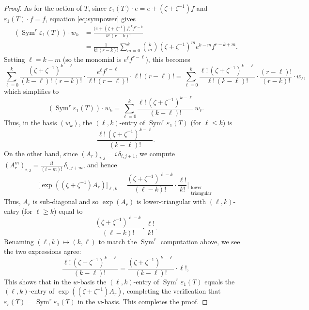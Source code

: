 \documentclass[11pt]{article}
\DeclareMathOperator{\Sym}{Sym}
\begin{document}
\begin{proof}
    As for the action of $ T $, since $\varepsilon_1(T)\cdot e = e + (\zeta+\zeta^{-1})f$ and $\varepsilon_1(T)\cdot f = f$, equation \eqref{eq:sympower} gives
    \begin{align*}
    \left(\Sym^r\varepsilon_1(T)\right)\cdot w_k
    &= \frac{\bigl(e+(\zeta+\zeta^{-1})f\bigr)^k f^{r-k}}{k!\,(r-k)!} \\
    &= \frac{1}{k!\,(r-k)!}\sum_{m=0}^{k}\binom{k}{m}(\zeta+\zeta^{-1})^m e^{k-m}f^{r-k+m}.
    \end{align*}
    Setting $\ell = k-m$ (so the monomial is $e^\ell f^{r-\ell}$), this becomes
    \[
    \sum_{\ell=0}^{k} \frac{(\zeta+\zeta^{-1})^{k-\ell}}{(k-\ell)!\,(r-k)!}\cdot \frac{e^\ell f^{r-\ell}}{\ell!\,(r-\ell)!}\cdot \ell!\,(r-\ell)!
    = \sum_{\ell=0}^{k} \frac{\ell!\,(\zeta+\zeta^{-1})^{k-\ell}}{\ell!\,(k-\ell)!} \cdot \frac{(r-\ell)!}{(r-k)!} \cdot w_\ell,
    \]
    which simplifies to
    \[
    \left(\Sym^r\varepsilon_1(T)\right)\cdot w_k = \sum_{\ell=0}^{k} \frac{\ell!\,(\zeta+\zeta^{-1})^{k-\ell}}{(k-\ell)!}\, w_\ell.
    \]
    Thus, in the basis $(w_k)$, the $(\ell,k)$-entry of $\Sym^r\varepsilon_1(T)$ (for $\ell \leq k$) is
    \[
    \frac{\ell!\,(\zeta+\zeta^{-1})^{k-\ell}}{(k-\ell)!}.
    \]
    On the other hand, since $(A_r)_{i,j}= i\,\delta_{i,j+1}$, we compute $(A_r^m)_{i,j} = \frac{i!}{(i-m)!}\,\delta_{i,j+m}$, and hence
    \[
    \bigl[\exp\!\left((\zeta+\zeta^{-1})A_r\right)\bigr]_{\ell,k} = \frac{(\zeta+\zeta^{-1})^{\ell-k}}{(\ell-k)!}\cdot\frac{\ell!}{k!}\Bigg|_{\substack{\text{lower}\\\text{triangular}}}
    \]
    Thus, $A_r$ is sub-diagonal and so $\exp(A_r)$ is lower-triangular with $(\ell,k)$-entry (for $\ell \geq k$) equal to
    \[
    \frac{(\zeta+\zeta^{-1})^{\ell-k}}{(\ell-k)!}\cdot\frac{\ell!}{k!}.
    \]
    Renaming $(\ell, k) \mapsto (k, \ell)$ to match the $\Sym^r$ computation above, we see the two expressions agree:
    \[
    \frac{\ell!\,(\zeta+\zeta^{-1})^{k-\ell}}{(k-\ell)!\,} = \frac{(\zeta+\zeta^{-1})^{k-\ell}}{(k-\ell)!}\cdot \ell!,
    \]
    This shows that in the $w$-basis the $(\ell, k)$-entry of $\Sym^r\varepsilon_1(T)$ equals the $(\ell,k)$-entry of $\exp((\zeta+\zeta^{-1})A_r)$, completing the verification that $\varepsilon_r(T) = \Sym^r\varepsilon_1(T)$ in the $w$-basis. This completes the proof.
\end{proof}



\printbibliography
\end{document}
